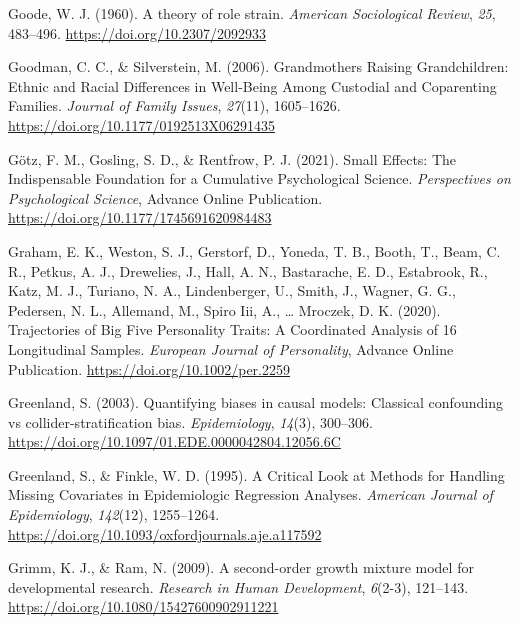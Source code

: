 \documentclass[
  english,
  man,floatsintext]{apa7}
\begin{document}
\leavevmode\hypertarget{ref-goodeTheoryRoleStrain1960}{}%
Goode, W. J. (1960). A theory of role strain. \emph{American Sociological Review}, \emph{25}, 483--496. \url{https://doi.org/10.2307/2092933}

\leavevmode\hypertarget{ref-goodmanGrandmothersRaisingGrandchildren2006}{}%
Goodman, C. C., \& Silverstein, M. (2006). Grandmothers Raising Grandchildren: Ethnic and Racial Differences in Well-Being Among Custodial and Coparenting Families. \emph{Journal of Family Issues}, \emph{27}(11), 1605--1626. \url{https://doi.org/10.1177/0192513X06291435}

\leavevmode\hypertarget{ref-gotzSmallEffectsIndispensable2021}{}%
Götz, F. M., Gosling, S. D., \& Rentfrow, P. J. (2021). Small Effects: The Indispensable Foundation for a Cumulative Psychological Science. \emph{Perspectives on Psychological Science}, Advance Online Publication. \url{https://doi.org/10.1177/1745691620984483}

\leavevmode\hypertarget{ref-grahamTrajectoriesBigFive2020}{}%
Graham, E. K., Weston, S. J., Gerstorf, D., Yoneda, T. B., Booth, T., Beam, C. R., Petkus, A. J., Drewelies, J., Hall, A. N., Bastarache, E. D., Estabrook, R., Katz, M. J., Turiano, N. A., Lindenberger, U., Smith, J., Wagner, G. G., Pedersen, N. L., Allemand, M., Spiro Iii, A., \ldots{} Mroczek, D. K. (2020). Trajectories of Big Five Personality Traits: A Coordinated Analysis of 16 Longitudinal Samples. \emph{European Journal of Personality}, Advance Online Publication. \url{https://doi.org/10.1002/per.2259}

\leavevmode\hypertarget{ref-greenlandQuantifyingBiasesCausal2003}{}%
Greenland, S. (2003). Quantifying biases in causal models: Classical confounding vs collider-stratification bias. \emph{Epidemiology}, \emph{14}(3), 300--306. \url{https://doi.org/10.1097/01.EDE.0000042804.12056.6C}

\leavevmode\hypertarget{ref-greenlandCriticalLookMethods1995}{}%
Greenland, S., \& Finkle, W. D. (1995). A Critical Look at Methods for Handling Missing Covariates in Epidemiologic Regression Analyses. \emph{American Journal of Epidemiology}, \emph{142}(12), 1255--1264. \url{https://doi.org/10.1093/oxfordjournals.aje.a117592}

\leavevmode\hypertarget{ref-grimmSecondorderGrowthMixture2009}{}%
Grimm, K. J., \& Ram, N. (2009). A second-order growth mixture model for developmental research. \emph{Research in Human Development}, \emph{6}(2-3), 121--143. \url{https://doi.org/10.1080/15427600902911221}
\end{document}
